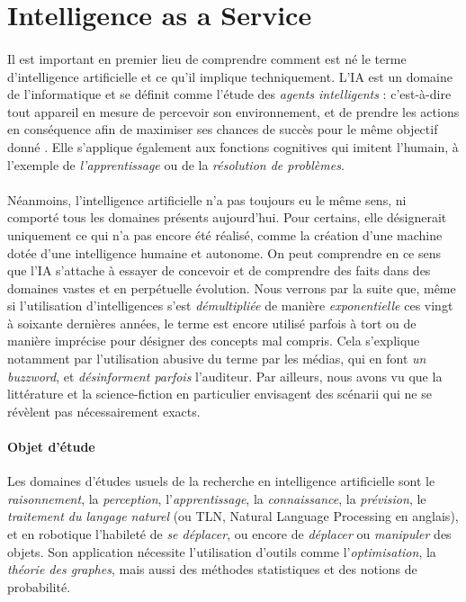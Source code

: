 \section{Intelligence as a Service}

\paragraph{} Il est important en premier lieu de comprendre comment est né le terme d'intelligence
artificielle et ce qu'il implique techniquement. L'IA est un domaine de l'informatique et se définit
comme l'étude des \emph{agents intelligents} : c'est-à-dire tout appareil en mesure de percevoir son
environnement, et de prendre les actions en conséquence afin de maximiser ses chances de succès pour
le même objectif donné \cite{AI0}. Elle s'applique également aux fonctions cognitives qui
imitent l'humain, à l'exemple de \emph{l'apprentissage} ou de la \emph{résolution de problèmes}.

\paragraph{} Néanmoins, l'intelligence artificielle n'a pas toujours eu le même sens, ni comporté
tous les domaines présents aujourd'hui. Pour certains, elle désignerait uniquement ce qui n'a
pas encore été réalisé, comme la création d'une machine dotée d'une intelligence humaine et autonome.
On peut comprendre en ce sens que l'IA s'attache à essayer de concevoir et de comprendre des faits
dans des domaines vastes et en perpétuelle évolution. Nous verrons par la suite que, même si
l'utilisation d'intelligences s'est \emph{démultipliée} de manière \emph{exponentielle} ces vingt
à soixante dernières années, le terme est encore utilisé parfois à tort ou de manière imprécise 
pour désigner des concepts mal compris. Cela s'explique notamment par l'utilisation abusive du terme 
par les médias, qui en font \emph{un buzzword}, et \emph{désinforment parfois} l'auditeur.
Par ailleurs, nous avons vu que la littérature et la science-fiction en particulier envisagent des
scénarii qui ne se révèlent pas nécessairement exacts. 

\paragraph{Objet d'étude} Les domaines d'études usuels de la recherche en intelligence artificielle sont le
\emph{raisonnement}, la \emph{perception}, l'\emph{apprentissage}, la \emph{connaissance}, la
\emph{prévision}, le \emph{traitement du langage naturel} (ou TLN, Natural Language Processing en anglais),
et en robotique l'habileté de \emph{se déplacer}, ou encore de \emph{déplacer} ou \emph{manipuler} des
objets. Son application nécessite l'utilisation d'outils comme l'\emph{optimisation}, la \emph{théorie des graphes},
mais aussi des méthodes statistiques et des notions de probabilité. 


